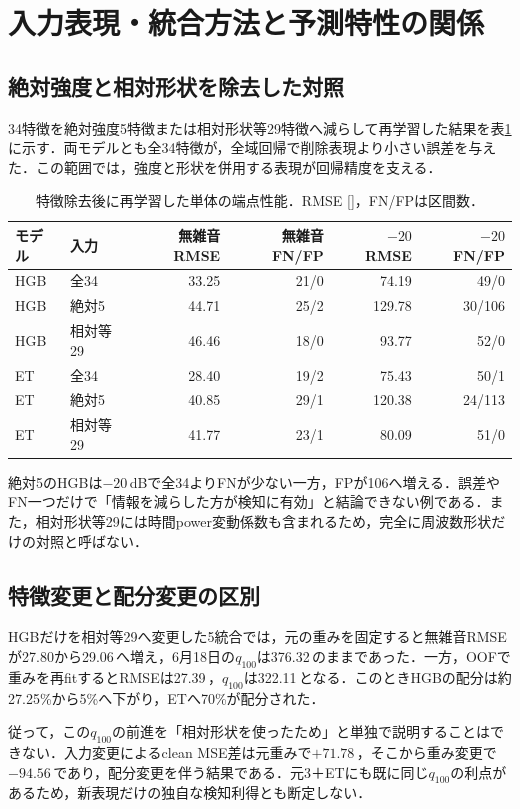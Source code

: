 \section{入力表現・統合方法と予測特性の関係}
\subsection{絶対強度と相対形状を除去した対照}
34特徴を絶対強度5特徴または相対形状等29特徴へ減らして再学習した結果を表\ref{tab:removal}に示す．両モデルとも全34特徴が，全域回帰で削除表現より小さい誤差を与えた．この範囲では，強度と形状を併用する表現が回帰精度を支える．
\begin{table}[htbp]
\centering\small
\caption{特徴除去後に再学習した単体の端点性能．RMSE [\kw{}]，FN/FPは区間数．}
\label{tab:removal}
\begin{tabular}{llrrrr}
\toprule
モデル & 入力 & 無雑音RMSE & 無雑音FN/FP & $-20$ RMSE & $-20$ FN/FP \\
\midrule
HGB & 全34 & 33.25 & 21/0 & 74.19 & 49/0 \\
HGB & 絶対5 & 44.71 & 25/2 & 129.78 & 30/106 \\
HGB & 相対等29 & 46.46 & 18/0 & 93.77 & 52/0 \\
ET & 全34 & 28.40 & 19/2 & 75.43 & 50/1 \\
ET & 絶対5 & 40.85 & 29/1 & 120.38 & 24/113 \\
ET & 相対等29 & 41.77 & 23/1 & 80.09 & 51/0 \\
\bottomrule
\end{tabular}
\end{table}

絶対5のHGBは$-20$\,dBで全34よりFNが少ない一方，FPが106へ増える．誤差やFN一つだけで「情報を減らした方が検知に有効」と結論できない例である．また，相対形状等29には時間power変動係数も含まれるため，完全に周波数形状だけの対照と呼ばない．

\subsection{特徴変更と配分変更の区別}
HGBだけを相対等29へ変更した5統合では，元の重みを固定すると無雑音RMSEが27.80から29.06\,\kw{}へ増え，6月18日の$q_{100}$は376.32\,\kw{}のままであった．一方，OOFで重みを再fitするとRMSEは27.39\,\kw{}，$q_{100}$は322.11\,\kw{}となる．このときHGBの配分は約27.25\%から5\%へ下がり，ETへ70\%が配分された\cite{localInput}．

従って，この$q_{100}$の前進を「相対形状を使ったため」と単独で説明することはできない．入力変更によるclean MSE差は元重みで$+71.78$\,\mseunit{}，そこから重み変更で$-94.56$\,\mseunit{}であり，配分変更を伴う結果である．元3＋ETにも既に同じ$q_{100}$の利点があるため，新表現だけの独自な検知利得とも断定しない．


